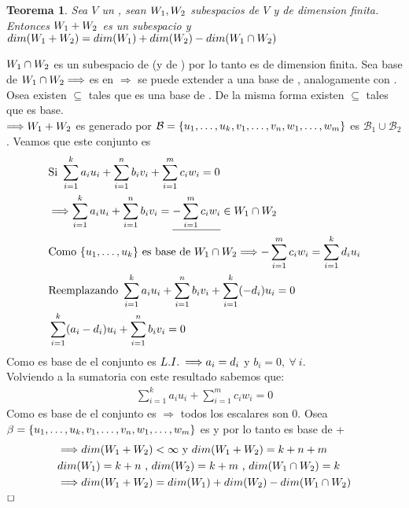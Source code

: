 \documentclass[]{article}
\newtheorem{theorem}{Teorema}
\newenvironment{proof}{\noindent{\bf Prueba:}}{$\hfill \Box$ \vspace{10pt}}
\newcommand{\ida}{\Longrightarrow}
\newcommand{\base}{\mathcal{B}}
\begin{document}
\begin{theorem}
    Sea $V$ un \espvec , sean $\text{$W_{1}$},\text{$W_{2}$}$ subespacios de $V$ y de dimension finita.\\
    Entonces $\text{$W_{1}$}+\text{$W_{2}$}$ es un subespacio y $dim(\text{$W_{1}$}+\text{$W_{2}$}) = dim(\text{$W_{1}$}) + dim(\text{$W_{2}$}) - dim(\text{$W_{1}$} \cap \text{$W_{2}$})$
\end{theorem}
\begin{proof}
    $\text{$W_{1}$}\cap\text{$W_{2}$}$ es un subespacio de  (y de ) por lo tanto es de dimension finita.
    Sea  base de $\W{1} \cap \W{2} \ida$  es \li en 
    $\ida$ se puede extender a una base de , analogamente con .\\
    Osea existen  $\subseteq$  tales que 
    es una base de . De la misma forma existen  $\subseteq$  tales que
     es base.\\
    $\ida \W{1}+\W{2}$ es generado por $\base= \conjunto{u_1,\dots,u_k,v_1,\dots,v_n,w_1,\dots,w_m}$
    es $\base_1 \cup \base_2$. Veamos que este conjunto es \li
    \begin{align*}
        &\text{Si } \sum_{i=1}^{k} a_i u_i + \sum_{i=1}^{n} b_i v_i + \sum_{i=1}^{m} c_i w_i = 0\\
        &\ida \sum_{i=1}^{k} a_i u_i + \sum_{i=1}^{n} b_i v_i = \underline{- \sum_{i=1}^{m} c_i w_i} \in \W{1}\cap\W{2}\\
        &\text{Como \conjunto{u_1,\dots,u_k} es base de } \W{1}\cap\W{2} \ida - \sum_{i=1}^{m} c_i w_i = \sum_{i=1}^{k} d_iu_i\\
        &\text{Reemplazando } \sum_{i=1}^{k} a_i u_i + \sum_{i=1}^{n} b_i v_i + \sum_{i=1}^{k} (-d_i)u_i = 0\\
        &\sum_{i=1}^{k} (a_i-d_i)u_i + \sum_{i=1}^{n} b_i v_i = 0
    \end{align*}
    Como  es base de  el conjunto es $\li\ida a_i=d_i$ y $b_i=0 ,\:\forall\: i$.\\
    Volviendo a la sumatoria con este resultado sabemos que:
    \begin{align*}
        \sum_{i=1}^{k} a_i u_i + \sum_{i=1}^{m} c_i w_i = 0
    \end{align*}
    Como  es base de  el conjunto es \li $\ida$ todos los escalares son 0.
    Osea $\beta = \text{$\{ {u_1,\dots,u_k,v_1,\dots,v_n,w_1,\dots,w_m} \}$}$ es \li y por lo tanto es base de +
    \begin{align*}
        &\ida dim(\W{1}+\W{2})<\infty \text{ y } dim(\W{1}+\W{2})=k+n+m\\
        &dim(\W{1})=k+n \text{ , } dim(\W{2})=k+m \text{ , } dim(\W{1}\cap\W{2})=k\\
        &\ida dim(\W{1}+\W{2}) = dim(\W{1})+dim(\W{2})-dim(\W{1}\cap\W{2})
    \end{align*}
\end{proof}
\end{document}
